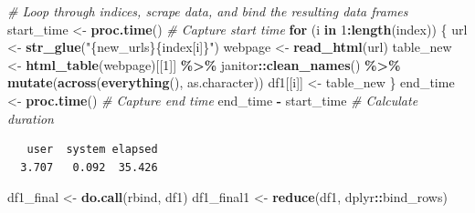 \documentclass[
]{book}
\newenvironment{Shaded}{\begin{snugshade}}{\end{snugshade}}
\newcommand{\CommentTok}[1]{\textcolor[rgb]{0.56,0.35,0.01}{\textit{#1}}}
\newcommand{\ControlFlowTok}[1]{\textcolor[rgb]{0.13,0.29,0.53}{\textbf{#1}}}
\newcommand{\DecValTok}[1]{\textcolor[rgb]{0.00,0.00,0.81}{#1}}
\newcommand{\FunctionTok}[1]{\textcolor[rgb]{0.13,0.29,0.53}{\textbf{#1}}}
\newcommand{\NormalTok}[1]{#1}
\newcommand{\OtherTok}[1]{\textcolor[rgb]{0.56,0.35,0.01}{#1}}
\newcommand{\SpecialCharTok}[1]{\textcolor[rgb]{0.81,0.36,0.00}{\textbf{#1}}}
\newcommand{\StringTok}[1]{\textcolor[rgb]{0.31,0.60,0.02}{#1}}
\begin{document}
\begin{Shaded}
\begin{Highlighting}[]
\CommentTok{\# Loop through indices, scrape data, and bind the resulting data frames}
\NormalTok{start\_time }\OtherTok{\textless{}{-}} \FunctionTok{proc.time}\NormalTok{() }\CommentTok{\# Capture start time}
\ControlFlowTok{for}\NormalTok{ (i }\ControlFlowTok{in} \DecValTok{1}\SpecialCharTok{:}\FunctionTok{length}\NormalTok{(index)) \{}
\NormalTok{  url }\OtherTok{\textless{}{-}} \FunctionTok{str\_glue}\NormalTok{(}\StringTok{"\{new\_urls\}\{index[i]\}"}\NormalTok{)}
\NormalTok{  webpage }\OtherTok{\textless{}{-}} \FunctionTok{read\_html}\NormalTok{(url)}
\NormalTok{  table\_new }\OtherTok{\textless{}{-}} \FunctionTok{html\_table}\NormalTok{(webpage)[[}\DecValTok{1}\NormalTok{]] }\SpecialCharTok{\%\textgreater{}\%}
\NormalTok{    janitor}\SpecialCharTok{::}\FunctionTok{clean\_names}\NormalTok{() }\SpecialCharTok{\%\textgreater{}\%}
    \FunctionTok{mutate}\NormalTok{(}\FunctionTok{across}\NormalTok{(}\FunctionTok{everything}\NormalTok{(), as.character))}
\NormalTok{  df1[[i]] }\OtherTok{\textless{}{-}}\NormalTok{ table\_new}
\NormalTok{\}}
\NormalTok{end\_time }\OtherTok{\textless{}{-}} \FunctionTok{proc.time}\NormalTok{() }\CommentTok{\# Capture end time}
\NormalTok{end\_time }\SpecialCharTok{{-}}\NormalTok{ start\_time }\CommentTok{\# Calculate duration}
\end{Highlighting}
\end{Shaded}

\begin{verbatim}
   user  system elapsed 
  3.707   0.092  35.426 
\end{verbatim}

\begin{Shaded}
\begin{Highlighting}[]
\NormalTok{df1\_final }\OtherTok{\textless{}{-}} \FunctionTok{do.call}\NormalTok{(rbind, df1)}
\NormalTok{df1\_final1 }\OtherTok{\textless{}{-}} \FunctionTok{reduce}\NormalTok{(df1, dplyr}\SpecialCharTok{::}\NormalTok{bind\_rows)}
\end{Highlighting}
\end{Shaded}
\end{document}
